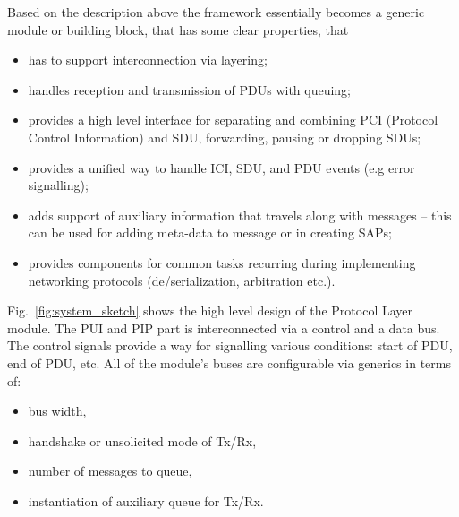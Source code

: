 \documentclass[journal]{IEEEtran}
\begin{document}
Based on the description above the framework essentially becomes a generic module or building block, that has some
clear properties, that
\begin{itemize}
    \renewcommand \labelitemi{--}
    \item has to support interconnection via layering;
    \item handles reception and transmission of PDUs with queuing;
    \item provides a high level interface for separating and combining PCI (Protocol Control Information) and SDU,
          forwarding, pausing or dropping SDUs;
    \item provides a unified way to handle ICI, SDU, and PDU events (e.g error signalling);
    \item adds support of auxiliary information that travels along with messages -- this can be used for adding
          meta-data to message or in creating SAPs;
    \item provides components for common tasks recurring during implementing networking protocols
          (de/serialization, arbitration etc.).
\end{itemize}

Fig.~\ref{fig:system_sketch} shows the high level design of the Protocol Layer module. The PUI and PIP part is
interconnected via a control and a data bus. The control signals provide a way for signalling various conditions: start
of PDU, end of PDU, etc. All of the module's buses are configurable via generics in terms of:
\begin{itemize}
    \renewcommand \labelitemi{--}
    \item bus width,
    \item handshake or unsolicited mode of Tx/Rx,
    \item number of messages to queue,
    \item instantiation of auxiliary queue for Tx/Rx.
\end{itemize}
\end{document}

